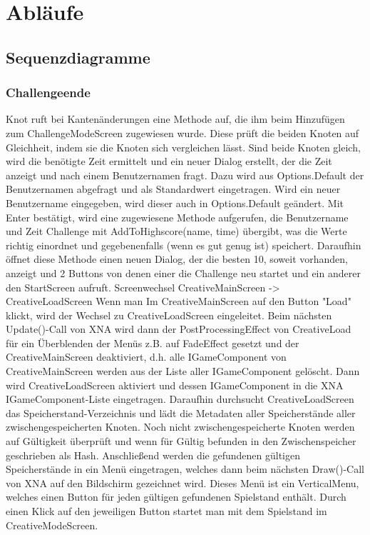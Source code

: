 \chapter{Abläufe}

\section{Sequenzdiagramme}
\subsection{Challengeende}
Knot ruft bei Kantenänderungen eine Methode auf, die ihm beim Hinzufügen zum ChallengeModeScreen zugewiesen wurde.
Diese prüft die beiden Knoten auf Gleichheit, indem sie die Knoten sich vergleichen lässt.
Sind beide Knoten gleich, wird die benötigte Zeit ermittelt und ein neuer Dialog erstellt, der die Zeit anzeigt und nach einem Benutzernamen fragt.
\newline
Dazu wird aus Options.Default der Benutzernamen abgefragt und als Standardwert eingetragen.
Wird ein neuer Benutzername eingegeben, wird dieser auch in Options.Default geändert.
Mit Enter bestätigt, wird eine zugewiesene Methode aufgerufen, die Benutzername und Zeit Challenge mit AddToHighscore(name, time) 
\newline
übergibt, was die Werte richtig einordnet und gegebenenfalls (wenn es gut genug ist) speichert.
Daraufhin öffnet diese Methode einen neuen Dialog, der die besten 10, soweit vorhanden, anzeigt und 2 Buttons 
von denen einer die Challenge neu startet und ein anderer den StartScreen aufruft.
\newline
\newline
Screenwechsel CreativeMainScreen -> CreativeLoadScreen
\newline
\newline
Wenn man Im CreativeMainScreen auf den Button "Load" klickt, wird der Wechsel zu CreativeLoadScreen eingeleitet.
Beim nächsten Update()-Call von XNA wird dann der PostProcessingEffect von CreativeLoad für ein Überblenden der Menüs z.B. auf FadeEffect gesetzt und der CreativeMainScreen deaktiviert, d.h. alle IGameComponent von CreativeMainScreen 
werden aus der Liste aller IGameComponent gelöscht. Dann wird CreativeLoadScreen aktiviert und dessen IGameComponent in die XNA IGameComponent-Liste eingetragen.
\newline
Daraufhin durchsucht CreativeLoadScreen das Speicherstand-Verzeichnis und lädt die Metadaten aller Speicherstände aller zwischengespeicherten Knoten. 
\newline
Noch nicht zwischengespeicherte Knoten werden auf Gültigkeit überprüft und wenn für Gültig befunden in den Zwischenspeicher geschrieben als Hash.
\newline
Anschließend werden die gefundenen gültigen Speicherstände in ein Menü eingetragen, welches dann beim nächsten Draw()-Call von XNA auf den Bildschirm gezeichnet wird.
\newline
Dieses Menü ist ein VerticalMenu, welches einen Button für jeden gültigen gefundenen Spielstand enthält. Durch einen Klick auf den jeweiligen Button 
startet man mit dem Spielstand im CreativeModeScreen.
